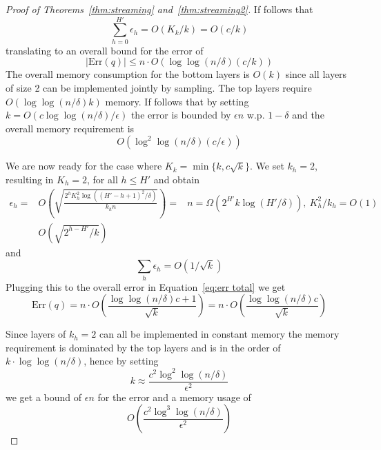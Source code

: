 \documentclass[anon,12pt]{colt2019} %
\newcommand{\eps}{\epsilon}
\newcommand{\komconstant}{c}
\begin{document}
\begin{proof} [Proof of Theorems~\ref{thm:streaming} and~\ref{thm:streaming2}]
If follows that 
$$ \sum_{h=0}^{H'} \eps_h = O(K_k/k) = O(\komconstant/k) $$
translating to an overall bound for the error of
$$ |\text{Err}(q)| \leq n \cdot O\left( \log \log(n/\delta)(\komconstant/k)  \right)$$
The overall memory consumption for the bottom layers is $O(k)$ since all layers of size 2 can be implemented jointly by sampling. The top layers require $O(\log\log(n/\delta)k)$ memory. If follows that by setting $k= O\left(\komconstant \log\log(n/\delta) / \eps\right)$ the error is bounded by $\eps n$ w.p. $1-\delta$ and the overall memory requirement is 
$$ O\left( \log^2 \log(n/\delta) (\komconstant/\eps)  \right) $$


We are now ready for the case where $K_k = \min\{k, \komconstant\sqrt{k}\}$. We set $k_h=2$, resulting in $K_h=2$, for all $h \leq H'$ and obtain
\begin{align*}
\eps_h = & O\left( \sqrt{\frac{2^h K_h^2 \log((H'-h+1)^2/\delta)}{k_h n}} \right) = & n=\Omega(2^{H'}k\log(H'/\delta)), \ K_h^2/k_h=O(1) \\
  	   &  O\left( \sqrt{2^{h-H'}/k} \right) 
\end{align*}
and 
$$ \sum_h \eps_h = O\left(1/\sqrt{k}\right) $$
Plugging this to the overall error in Equation~\eqref{eq:err total} we get
$$ \text{Err}(q) = n \cdot O\left( \frac{\log \log(n/\delta)\komconstant + 1}{\sqrt{k}}  \right) =  n \cdot O\left( \frac{\log \log(n/\delta)\komconstant }{\sqrt{k}}  \right) $$

Since layers of $k_h=2$ can all be implemented in constant memory the memory requirement is dominated by the top layers and is in the order of $k \cdot \log\log(n/\delta)$, hence by setting 
$$k \approx \frac{\komconstant^2 \log^2\log(n/\delta)}{\eps^2}$$ 
we get a bound of $\eps n$ for the error and a memory usage of 
$$ O\left( \frac{\komconstant^2 \log^3\log(n/\delta)}{\eps^2}\right) $$
\end{proof}
\end{document}
